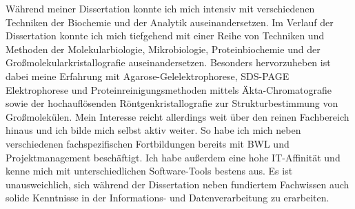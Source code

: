     {Während meiner Dissertation konnte ich mich intensiv mit verschiedenen Techniken der Biochemie und der Analytik auseinandersetzen. }
    {Im Verlauf der Dissertation konnte ich mich tiefgehend mit einer Reihe von Techniken und Methoden der Molekularbiologie, Mikrobiologie, Proteinbiochemie und der Großmolekularkristallografie auseinandersetzen. Besonders hervorzuheben ist dabei meine Erfahrung 
    mit Agarose-Gelelektrophorese, SDS-PAGE Elektrophorese und Proteinreinigungsmethoden mittels Äkta-Chromatografie sowie der hochauflösenden Röntgenkristallografie zur Strukturbestimmung von Großmolekülen.}
Mein Interesse reicht allerdings weit über den reinen Fachbereich hinaus und ich bilde mich selbst aktiv weiter. So habe ich mich neben verschiedenen fachspezifischen Fortbildungen bereits mit BWL und Projektmanagement beschäftigt. Ich habe außerdem eine hohe IT-Affinität und kenne mich mit unterschiedlichen Software-Tools bestens aus. Es ist unausweichlich, sich während der Dissertation neben fundiertem Fachwissen auch solide Kenntnisse in der Informations- und Datenverarbeitung zu erarbeiten.
